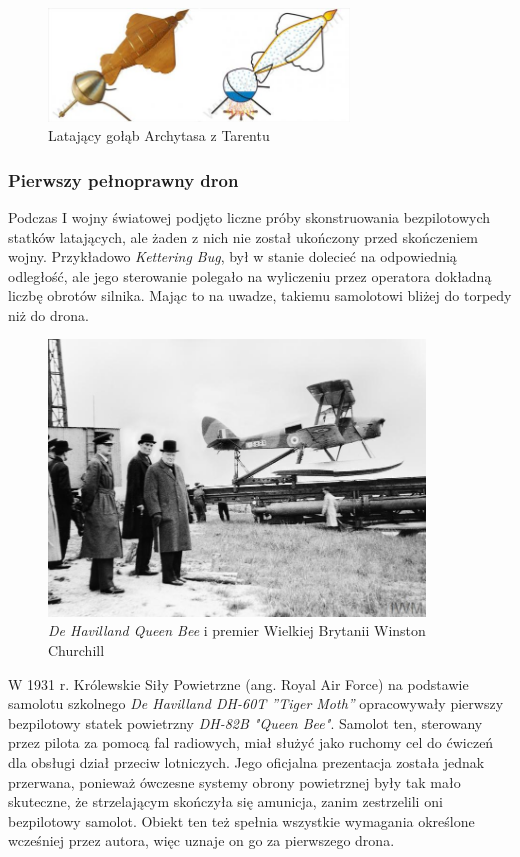 \begin{figure}[!ht]
\begin{center}
  \includegraphics[width=8cm]{./Obrazy/golab.jpg}
  \caption{Latający gołąb Archytasa z Tarentu}
\end{center}
\end{figure}

\subsubsection{Pierwszy pełnoprawny dron}
Podczas I wojny światowej podjęto liczne próby skonstruowania bezpilotowych statków latających, ale żaden z nich nie został ukończony przed skończeniem wojny. Przykładowo \textit{Kettering Bug}, był w stanie dolecieć na odpowiednią odległość, ale jego sterowanie polegało na wyliczeniu przez operatora dokładną liczbę obrotów silnika. Mając to na uwadze, takiemu samolotowi bliżej do torpedy niż do drona. 

\begin{figure}[ht!]
\begin{center}
  \includegraphics[width=10cm]{./Obrazy/queen-bee.jpg}
  \caption{\textit{De Havilland Queen Bee} i premier Wielkiej Brytanii Winston Churchill}
\end{center}
\end{figure}

W 1931 r. Królewskie Siły Powietrzne (ang. Royal Air Force) na podstawie samolotu szkolnego \textit{De Havilland DH-60T ”Tiger Moth”} opracowywały pierwszy bezpilotowy statek powietrzny \textit{DH-82B "Queen Bee"}.  Samolot ten, sterowany przez pilota za pomocą fal radiowych, miał służyć jako ruchomy cel do ćwiczeń dla obsługi dział przeciw lotniczych. Jego oficjalna prezentacja została jednak przerwana, ponieważ ówczesne systemy obrony powietrznej były tak mało skuteczne, że strzelającym skończyła się amunicja, zanim zestrzelili oni bezpilotowy samolot. Obiekt ten też spełnia wszystkie wymagania określone wcześniej przez autora, więc uznaje on go za pierwszego drona.

